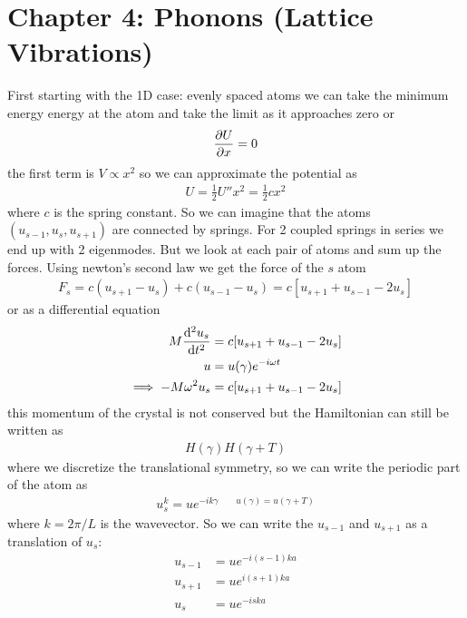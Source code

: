 \documentclass[../main.tex]{subfiles}
\begin{document}
\pagestyle{fancy}

\section*{Chapter 4: Phonons (Lattice Vibrations)}

First starting with the 1D case: evenly spaced atoms we can take the minimum energy energy at the
atom and take the limit as it approaches zero or
\begin{align*}
    \pdv{U}{x} = 0
\end{align*}
the first term is $V \propto x^2$ so we can approximate the potential as
\begin{align*}
    U = \frac{1}{2} U'' x^2 = \frac{1}{2} c x^2
\end{align*}
where $c$ is the spring constant. So we can imagine that the atoms $(u_{s-1}, u_s, u_{s+1})$ are
connected by springs. For 2 coupled springs in series we end up with 2 eigenmodes. But we look at
each pair of atoms and sum up the forces. Using newton's second law we get the force of the $s$ atom 
\begin{align*}
    F_s = c (u_{s+1} - u_s) + c (u_{s-1} - u_s) = c [u_{s+1} + u_{s-1} - 2u_s]
\end{align*}
or as a differential equation
\begin{align*}
    M \dv[2]{u_s}{t} &= c [u_{s+1} + u_{s-1} - 2u_s] \\
    u &= u(\gamma) e^{-i\omega t} \\
    \implies -M \omega^2 u_s &= c [u_{s+1} + u_{s-1} - 2u_s]
\end{align*}
this momentum of the crystal is not conserved but the Hamiltonian can still be written as
\begin{align*}
    H(\gamma) H(\gamma + T)
\end{align*}
where we discretize the translational symmetry, so we can write the periodic part of the atom as
\begin{align*}
    u_s^k = u e^{-ik\gamma \qquad u(\gamma) = u(\gamma + T)}
\end{align*}
where $k = 2\pi/L$ is the wavevector. So we can write the $u_{s-1}$ and $u_{s+1}$ as a translation
of $u_s$:
\begin{align*}
    u_{s-1} &= u e^{-i(s-1)ka} \\
    u_{s+1} &= u e^{i(s+1)ka} \\
    u_s &= u e^{-iska}
\end{align*}
\end{document}
